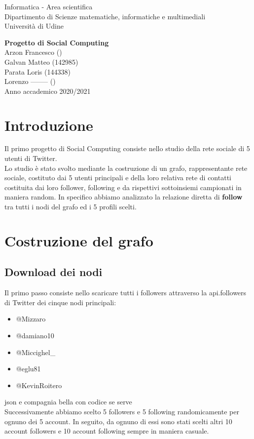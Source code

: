 \documentclass[a4paper,11pt]{report}
\begin{document}
\begin{titlepage}
  \clearpage\thispagestyle{empty}
  \centering
  \vspace{1cm}
  {\normalsize Informatica - Area scientifica \\  Dipartimento di Scienze matematiche, informatiche e multimediali\\  Università di Udine \par}
  \vspace{3cm}
  {\Huge \textbf{Progetto di Social Computing}}\\
  \vspace{4cm}
  {\Large Arzon Francesco ()\\ Galvan Matteo (142985)\\ Parata Loris (144338)\\ Lorenzo -------- ()}\\
  \vspace{12cm}
  {\normalsize Anno accademico 2020/2021}
  \pagebreak
\end{titlepage}

\tableofcontents{}
\pagebreak

\chapter{Introduzione}
Il primo progetto di Social Computing consiste nello studio della rete sociale di 5 utenti di Twitter.\\
Lo studio è stato svolto mediante la costruzione di un grafo, rappresentante  rete sociale, costituto dai 5 utenti principali e della loro relativa rete di contatti costituita dai loro follower, following e da rispettivi sottoinsiemi campionati in maniera random.
In specifico abbiamo analizzato la relazione diretta di \textbf{follow} tra tutti i nodi del grafo ed i 5 profili scelti.

\pagebreak

\chapter{Costruzione del grafo}
\section{Download dei nodi}
Il primo passo consiste nello scaricare tutti i followers attraverso la api.followers di Twitter dei cinque nodi principali:

\begin{itemize}
\item @Mizzaro
\item @damiano10
\item @Miccighel\_
\item @eglu81
\item @KevinRoitero
 \end{itemize}
json e compagnia bella con codice se serve \\
\setlength{\parindent}{0pt} 
Successivamente abbiamo scelto 5 followers e 5 following randomicamente per ognuno dei 5 account. In seguito, da ognuno di essi sono stati scelti altri 10 account followers e 10 account following sempre in maniera casuale.\\
\end{document}
